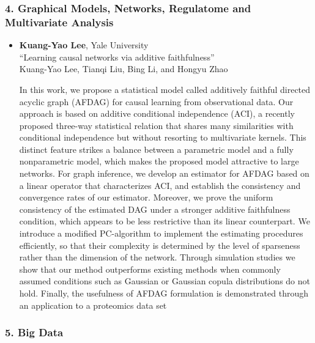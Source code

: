 \subsubsection*{4. Graphical Models, Networks, Regulatome and Multivariate Analysis}

\begin{itemize}
\item \textbf{Kuang-Yao Lee}, Yale University \\
``Learning causal networks via additive faithfulness'' \\
Kuang-Yao Lee, Tianqi Liu, Bing Li, and Hongyu Zhao


In this work, we propose a statistical model called additively faithful directed acyclic graph (AFDAG) for causal learning from observational data. Our approach is based on additive conditional independence (ACI), a recently proposed three-way statistical relation that shares many similarities with conditional independence but without resorting to multivariate kernels. This distinct feature strikes a balance between a parametric model and a fully nonparametric model, which makes the proposed model attractive to large networks. For graph inference, we develop an estimator  for AFDAG  based on a linear operator  that characterizes ACI, and establish the consistency and convergence rates of our estimator. Moreover, we prove the uniform consistency of the estimated DAG under a stronger additive faithfulness condition, which appears to be less restrictive than its linear counterpart. We introduce a modified PC-algorithm to implement the estimating procedures efficiently, so that their complexity is determined by the level of sparseness rather than the dimension of the network. Through simulation studies we show that our method outperforms  existing methods when commonly assumed conditions such as Gaussian or Gaussian copula distributions do not hold. Finally, the usefulness of AFDAG formulation is demonstrated through an application to a proteomics data set

\end{itemize}

\subsubsection*{5. Big Data}

